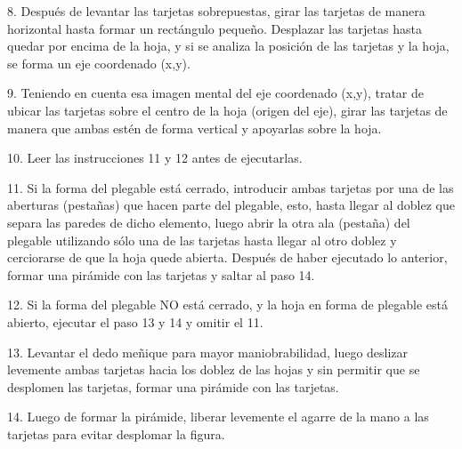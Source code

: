 \documentclass{article}
\begin{document}
8. Después de levantar las tarjetas sobrepuestas, girar las tarjetas de manera horizontal hasta formar un rectángulo pequeño. Desplazar las tarjetas hasta quedar por encima de la hoja, y si se analiza la posición de las tarjetas y la hoja, se forma un eje coordenado (x,y).

9. Teniendo en cuenta esa imagen mental del eje coordenado (x,y), tratar de ubicar las tarjetas sobre el centro de la hoja (origen del eje), girar las tarjetas de manera que ambas estén de forma vertical y apoyarlas sobre la hoja.

10. Leer las instrucciones 11 y 12 antes de ejecutarlas.

11. Si la forma del plegable está cerrado, introducir ambas tarjetas por una de las aberturas (pestañas) que hacen parte del plegable, esto, hasta llegar al doblez que separa las paredes de dicho elemento, luego abrir la otra ala (pestaña) del plegable utilizando sólo una de las tarjetas hasta llegar al otro doblez y cerciorarse de que la hoja quede abierta. Después de haber ejecutado lo anterior, formar una pirámide con las tarjetas y saltar al paso 14.

12. Si la forma del plegable NO está cerrado, y la hoja en forma de plegable está abierto, ejecutar el paso 13 y 14 y omitir el 11.

13. Levantar el dedo meñique para mayor maniobrabilidad, luego deslizar levemente ambas tarjetas hacia los doblez de las hojas y sin permitir que se desplomen las tarjetas, formar una pirámide con las tarjetas.

14. Luego de formar la pirámide, liberar levemente el agarre de la mano a las tarjetas para evitar desplomar la figura.
\end{document}
